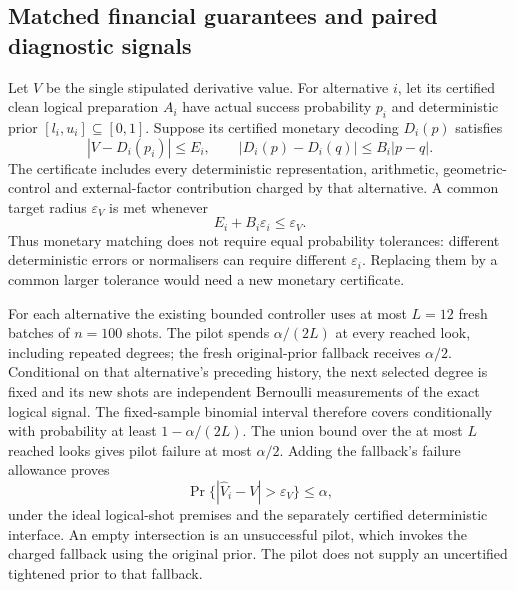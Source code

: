 \documentclass[11pt]{article}
\begin{document}
\subsection{Matched financial guarantees and paired diagnostic signals}
\label{supp:matched-estimator-transfer}

Let $V$ be the single stipulated derivative value. For alternative
$i$, let its certified clean logical preparation $A_i$ have actual
success probability $p_i$ and deterministic prior
$[l_i,u_i]\subseteq[0,1]$. Suppose its certified monetary decoding
$D_i(p)$ satisfies
\begin{equation}
 |V-D_i(p_i)|\leq E_i,
 \qquad |D_i(p)-D_i(q)|\leq B_i|p-q|.
 \label{eq:matched-financial-interface}
\end{equation}
The certificate includes every deterministic representation, arithmetic,
geometric-control and external-factor contribution charged by that
alternative. A common target radius $\varepsilon_V$ is met whenever
\begin{equation}
 E_i+B_i\varepsilon_i\leq\varepsilon_V.
 \label{eq:matched-monetary-budget}
\end{equation}
Thus monetary matching does not require equal probability tolerances:
different deterministic errors or normalisers can require different
$\varepsilon_i$. Replacing them by a common larger tolerance would need
a new monetary certificate.

For each alternative the existing bounded controller uses at most
$L=12$ fresh batches of $n=100$ shots. The pilot spends
$\alpha/(2L)$ at every reached look, including repeated degrees; the
fresh original-prior fallback receives $\alpha/2$. Conditional on that
alternative's preceding history, the next selected degree is fixed and
its new shots are independent Bernoulli measurements of the exact
logical signal. The fixed-sample binomial interval therefore covers
conditionally with probability at least $1-\alpha/(2L)$.
The union bound over the at most $L$ reached looks gives pilot failure
at most $\alpha/2$. Adding the fallback's failure allowance proves
\begin{equation}
 \Pr\{|\widehat V_i-V|>\varepsilon_V\}\leq\alpha,
 \label{eq:matched-alternative-coverage}
\end{equation}
under the ideal logical-shot premises and the separately certified
deterministic interface. An empty intersection is an unsuccessful pilot,
which invokes the charged fallback using the original prior. The pilot
does not supply an uncertified tightened prior to that fallback.
\end{document}
